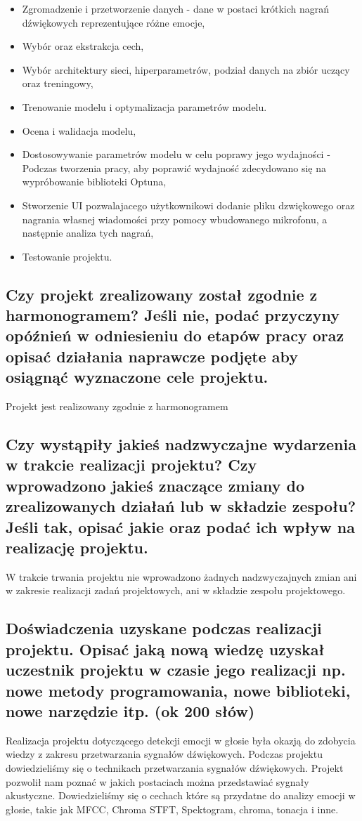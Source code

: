 \documentclass[12pt,titlepage]{article}
\begin{document}
\begin{itemize}
    \item Zgromadzenie i przetworzenie danych - dane w postaci krótkich nagrań dźwiękowych reprezentujące różne emocje,
    \item Wybór oraz ekstrakcja cech,
    \item Wybór architektury sieci, hiperparametrów, podział danych na zbiór uczący oraz treningowy,
    \item Trenowanie modelu i optymalizacja parametrów modelu. 
    \item Ocena i walidacja modelu,
    \item Dostosowywanie parametrów modelu w celu poprawy jego wydajności - Podczas tworzenia pracy, aby poprawić wydajność zdecydowano się na wypróbowanie biblioteki Optuna,
    \item Stworzenie UI pozwalajacego użytkownikowi dodanie pliku dzwiękowego oraz nagrania własnej wiadomości przy pomocy wbudowanego mikrofonu, a następnie analiza tych nagrań,
    \item Testowanie projektu.
\end{itemize}



\subsection{Czy projekt zrealizowany został zgodnie z harmonogramem? Jeśli nie, podać przyczyny opóźnień w odniesieniu do etapów pracy oraz opisać działania naprawcze podjęte aby osiągnąć wyznaczone cele projektu.}
Projekt jest realizowany zgodnie z harmonogramem

\subsection{Czy wystąpiły jakieś nadzwyczajne wydarzenia w trakcie realizacji projektu? Czy wprowadzono jakieś znaczące zmiany do zrealizowanych działań lub w składzie zespołu? Jeśli tak, opisać jakie oraz podać ich wpływ na realizację projektu.}
W trakcie trwania projektu nie wprowadzono żadnych nadzwyczajnych zmian ani w zakresie realizacji zadań projektowych, ani w składzie zespołu projektowego.

\subsection{Doświadczenia uzyskane podczas realizacji projektu. Opisać jaką nową wiedzę uzyskał uczestnik projektu w czasie jego realizacji np. nowe metody programowania, nowe biblioteki, nowe narzędzie itp. (ok 200 słów)}
Realizacja projektu dotyczącego detekcji emocji w głosie była okazją do zdobycia wiedzy z zakresu przetwarzania sygnałów dźwiękowych. Podczas projektu dowiedzieliśmy się o technikach przetwarzania sygnałów dźwiękowych. Projekt pozwolił nam poznać w jakich postaciach można przedstawiać sygnały akustyczne. Dowiedzieliśmy się o cechach które są przydatne do analizy emocji w głosie, takie jak MFCC, Chroma STFT, Spektogram, chroma, tonacja i inne.
\end{document}
